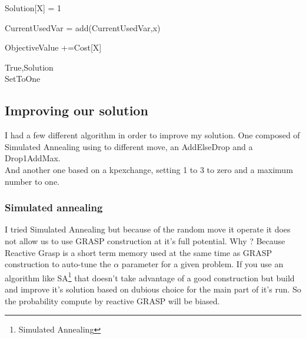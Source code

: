 \documentclass[12pt]{article}
\begin{document}
	\begin{algorithm}[H]
			
		Solution[X] 		= 1
		
		CurrentUsedVar 		= add(CurrentUsedVar,x)
		
		ObjectiveValue 		+=Cost[X]		
		
		\Return True,Solution\\
		
		\caption{SetToOne}
	\end{algorithm}
	\subsection{Improving our solution}
	I had a few different algorithm in order to improve my solution. One composed of Simulated Annealing using to different move,
	an AddElseDrop and a Drop1AddMax.\\
	And another one based on a kpexchange, setting 1 to 3 to zero and a maximum number to one.\\
	\subsubsection{Simulated annealing}
	I tried Simulated Annealing but because of the random move it operate it does not allow us to use GRASP construction at it's full potential. Why ? Because Reactive Grasp is a short term memory used at the same time as GRASP construction to auto-tune the $\alpha$ parameter for a given problem. If you use an algorithm like SA\footnote{Simulated Annealing} that doesn't take advantage of a good construction but build and improve it's solution based on dubious choice for the main part of it's run.
	So the probability compute by reactive GRASP will be biased.
	
\end{document}
